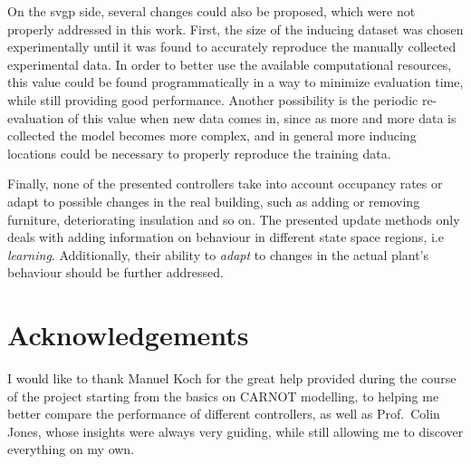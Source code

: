 On the \acrshort{svgp} side, several changes could also be proposed, which were
not properly addressed in this work. First, the size of the inducing dataset was
chosen experimentally until it was found to accurately reproduce the manually
collected experimental data. In order to better use the available computational
resources, this value could be found programmatically in a way to minimize
evaluation time, while still providing good performance. Another possibility is
the periodic re-evaluation of this value when new data comes in, since as more
and more data is collected the model becomes more complex, and in general more
inducing locations could be necessary to properly reproduce the training data.

Finally, none of the presented controllers take into account occupancy rates or
adapt to possible changes in the real building, such as adding or removing
furniture, deteriorating insulation and so on. The presented update methods only
deals with adding information on behaviour in different state space regions, i.e
\textit{learning}. Additionally, their ability to \textit{adapt} to changes in
the actual plant's behaviour should be further addressed.

\section*{Acknowledgements}

I would like to thank Manuel Koch for the great help provided during the course
of the project starting from the basics on CARNOT modelling, to helping me
better compare the performance of different controllers, as well as Prof.\ Colin
Jones, whose insights were always very guiding, while still allowing me to
discover everything on my own.

\clearpage
